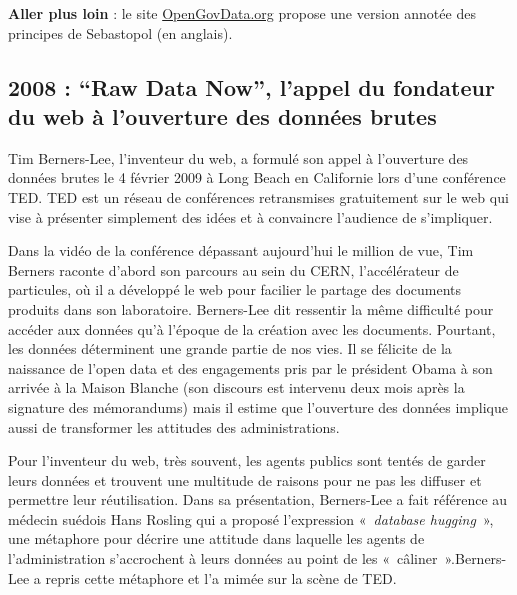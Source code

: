 \documentclass[]{book}
\theoremstyle{definition}
\theoremstyle{definition}
\theoremstyle{definition}
\theoremstyle{remark}
\begin{document}
\textbf{Aller plus loin} : le site
\href{https://opengovdata.org/}{OpenGovData.org} propose une version
annotée des principes de Sebastopol (en anglais).

\subsection{\texorpdfstring{2008 : ``Raw Data Now'', l'appel du
fondateur du web à l'ouverture des données
brutes}{2008 : Raw Data Now, l'appel du fondateur du web à l'ouverture des données brutes}}\label{raw-data-now-lappel-du-fondateur-du-web-a-louverture-des-donnees-brutes}

Tim Berners-Lee, l'inventeur du web, a formulé son appel à l'ouverture
des données brutes le 4 février 2009 à Long Beach en Californie lors
d'une conférence TED. TED est un réseau de conférences retransmises
gratuitement sur le web qui vise à présenter simplement des idées et à
convaincre l'audience de s'impliquer.

Dans la vidéo de la conférence dépassant aujourd'hui le million de vue,
Tim Berners raconte d'abord son parcours au sein du CERN, l'accélérateur
de particules, où il a développé le web pour facilier le partage des
documents produits dans son laboratoire. Berners-Lee dit ressentir la
même difficulté pour accéder aux données qu'à l'époque de la création
avec les documents. Pourtant, les données déterminent une grande partie
de nos vies. Il se félicite de la naissance de l'open data et des
engagements pris par le président Obama à son arrivée à la Maison
Blanche (son discours est intervenu deux mois après la signature des
mémorandums) mais il estime que l'ouverture des données implique aussi
de transformer les attitudes des administrations.

Pour l'inventeur du web, très souvent, les agents publics sont tentés de
garder leurs données et trouvent une multitude de raisons pour ne pas
les diffuser et permettre leur réutilisation. Dans sa présentation,
Berners-Lee a fait référence au médecin suédois Hans Rosling qui a
proposé l'expression «~\emph{database hugging}~», une métaphore pour
décrire une attitude dans laquelle les agents de l'administration
s'accrochent à leurs données au point de les «~câliner~».Berners-Lee a
repris cette métaphore et l'a mimée sur la scène de TED.
\end{document}
